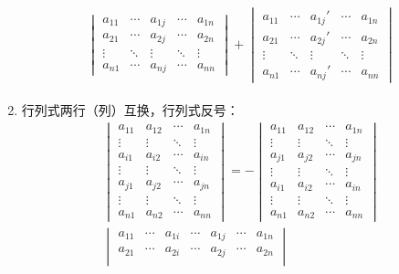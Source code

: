 \begin{property}
\begin{enumerate}
\begin{gather*}
\begin{aligned}
\begin{vmatrix}
					a_{11} & \cdots & a_{1j} & \cdots & a_{1n} \\
					a_{21} & \cdots & a_{2j} & \cdots & a_{2n} \\
					\vdots & \ddots & \vdots & \ddots & \vdots \\
					a_{n1} & \cdots & a_{nj} & \cdots & a_{nn}
				\end{vmatrix}+
				\begin{vmatrix}
					a_{11} & \cdots & a_{1j}' & \cdots & a_{1n} \\
					a_{21} & \cdots & a_{2j}' & \cdots & a_{2n} \\
					\vdots & \ddots & \vdots & \ddots & \vdots \\
					a_{n1} & \cdots & a_{nj}' & \cdots & a_{nn}
				\end{vmatrix}
			\end{aligned}
		\end{gather*}
		\item 行列式两行（列）互换，行列式反号：
		\begin{gather*}
			\begin{vmatrix}
				a_{11} & a_{12} & \cdots & a_{1n} \\
				\vdots & \vdots & \ddots & \vdots \\
				a_{i1} & a_{i2} & \cdots & a_{in} \\
				\vdots & \vdots & \ddots & \vdots \\
				a_{j1} & a_{j2} & \cdots & a_{jn} \\
				\vdots & \vdots & \ddots & \vdots \\
				a_{n1} & a_{n2} & \cdots & a_{nn}
			\end{vmatrix}=-
			\begin{vmatrix}
				a_{11} & a_{12} & \cdots & a_{1n} \\
				\vdots & \vdots & \ddots & \vdots \\
				a_{j1} & a_{j2} & \cdots & a_{jn} \\
				\vdots & \vdots & \ddots & \vdots \\
				a_{i1} & a_{i2} & \cdots & a_{in} \\
				\vdots & \vdots & \ddots & \vdots \\
				a_{n1} & a_{n2} & \cdots & a_{nn}
			\end{vmatrix} \\
			\begin{vmatrix}
				a_{11} & \cdots & a_{1i} & \cdots & a_{1j} & \cdots & a_{1n} \\
				a_{21} & \cdots & a_{2i} & \cdots & a_{2j} & \cdots & a_{2n} \\

\end{vmatrix}
\end{gather*}
\end{enumerate}
\end{property}
